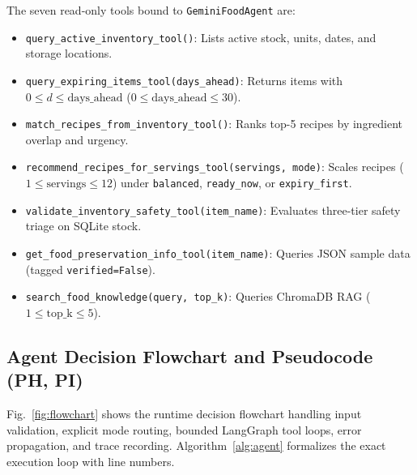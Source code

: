 \documentclass[conference]{IEEEtran}
\begin{document}
The seven read-only tools bound to \texttt{GeminiFoodAgent} are:
\begin{itemize}
    \item \texttt{query\_active\_inventory\_tool()}: Lists active stock, units, dates, and storage locations.
    \item \texttt{query\_expiring\_items\_tool(days\_ahead)}: Returns items with $0 \le d \le \text{days\_ahead}$ ($0 \le \text{days\_ahead} \le 30$).
    \item \texttt{match\_recipes\_from\_inventory\_tool()}: Ranks top-5 recipes by ingredient overlap and urgency.
    \item \texttt{recommend\_recipes\_for\_servings\_tool(servings, mode)}: Scales recipes ($1 \le \text{servings} \le 12$) under \texttt{balanced}, \texttt{ready\_now}, or \texttt{expiry\_first}.
    \item \texttt{validate\_inventory\_safety\_tool(item\_name)}: Evaluates three-tier safety triage on SQLite stock.
    \item \texttt{get\_food\_preservation\_info\_tool(item\_name)}: Queries JSON sample data (tagged \texttt{verified=False}).
    \item \texttt{search\_food\_knowledge(query, top\_k)}: Queries ChromaDB RAG ($1 \le \text{top\_k} \le 5$).
\end{itemize}

\subsection{Agent Decision Flowchart and Pseudocode (PH, PI)}
Fig.~\ref{fig:flowchart} shows the runtime decision flowchart handling input validation, explicit mode routing, bounded LangGraph tool loops, error propagation, and trace recording. Algorithm~\ref{alg:agent} formalizes the exact execution loop with line numbers.
\end{document}
